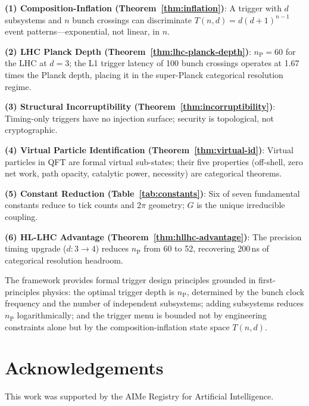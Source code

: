 \documentclass[twocolumn,10pt,a4paper]{article}
\theoremstyle{thmstyle}
\theoremstyle{definition}
\theoremstyle{remark}
\newcommand{\nP}{n_{\mathrm{P}}}
\begin{document}
\textbf{(1) Composition-Inflation (Theorem~\ref{thm:inflation})}: A
trigger with $d$ subsystems and $n$ bunch crossings can discriminate
$T(n,d) = d(d+1)^{n-1}$ event patterns---exponential, not linear,
in $n$.

\textbf{(2) LHC Planck Depth (Theorem~\ref{thm:lhc-planck-depth})}:
$\nP = 60$ for the LHC at $d = 3$; the L1 trigger latency of 100
bunch crossings operates at 1.67 times the Planck depth, placing it
in the super-Planck categorical resolution regime.

\textbf{(3) Structural Incorruptibility (Theorem~\ref{thm:incorruptibility})}:
Timing-only triggers have no injection surface; security is topological,
not cryptographic.

\textbf{(4) Virtual Particle Identification (Theorem~\ref{thm:virtual-id})}:
Virtual particles in QFT are formal virtual sub-states; their five
properties (off-shell, zero net work, path opacity, catalytic power,
necessity) are categorical theorems.

\textbf{(5) Constant Reduction (Table~\ref{tab:constants})}: Six of
seven fundamental constants reduce to tick counts and $2\pi$ geometry;
$G$ is the unique irreducible coupling.

\textbf{(6) HL-LHC Advantage (Theorem~\ref{thm:hllhc-advantage})}:
The precision timing upgrade ($d: 3\to 4$) reduces $\nP$ from 60 to
52, recovering 200\,ns of categorical resolution headroom.

The framework provides formal trigger design principles grounded in
first-principles physics: the optimal trigger depth is $\nP$,
determined by the bunch clock frequency and the number of independent
subsystems; adding subsystems reduces $\nP$ logarithmically; and
the trigger menu is bounded not by engineering constraints alone but
by the composition-inflation state space $T(n,d)$.

\section*{Acknowledgements}
This work was supported by the AIMe Registry for Artificial Intelligence.



\end{document}
